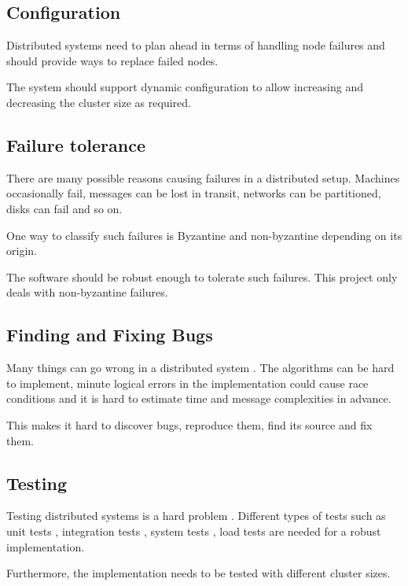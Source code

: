 \subsection{Configuration}

Distributed systems need to plan ahead in terms of handling node failures and
should provide ways to replace failed nodes. 

The system should support dynamic configuration to allow increasing and
decreasing the cluster size as required.

\subsection{Failure tolerance}

There are many possible reasons causing failures in a distributed setup. 
Machines occasionally fail, messages can be lost in transit, networks can be
partitioned, disks can fail and so on.

One way to classify such failures is Byzantine%
and non-byzantine%
depending on its origin.

The software should be robust enough to tolerate such failures. This project 
only deals with non-byzantine failures.

\subsection{Finding and Fixing Bugs}

Many things can go wrong in a distributed system 
\citep{Rotem-gal-oz_fallaciesof}. The algorithms can be hard to implement, 
minute logical errors in the implementation could cause race conditions and
it is hard to estimate time and message complexities in advance.

This makes it hard to discover bugs, reproduce them, find its source and fix
them.

\subsection{Testing}

Testing distributed systems is a hard problem \citep{BoyCPW2003}.
Different types of tests such as unit tests%
, integration tests%
, system tests%
, load tests%
are needed for a robust implementation.

Furthermore, the implementation needs to be tested with different cluster sizes. 

